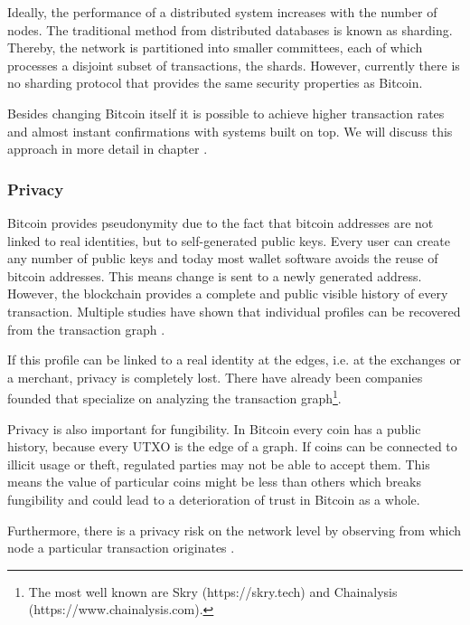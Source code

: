 Ideally, the performance of a distributed system increases with the number of nodes. The traditional method from distributed databases is known as sharding. Thereby, the network is partitioned into smaller committees, each of which processes a disjoint subset of transactions, the shards. However, currently there is no sharding protocol that provides the same security properties as Bitcoin.
 
Besides changing Bitcoin itself it is possible to achieve higher transaction rates and almost instant confirmations with systems built on top. We will discuss this approach in more detail in chapter \parencite{sec:m2m}.
 
\subsubsection{Privacy}
\label{sec:crypto_chall_privacy}

Bitcoin provides pseudonymity due to the fact that bitcoin addresses are not linked to real identities, but to self-generated public keys. Every user can create any number of public keys and today most wallet software avoids the reuse of bitcoin addresses. This means change is sent to a newly generated address. However, the blockchain provides a complete and public visible history of every transaction.  Multiple studies have shown that individual profiles can be recovered from the transaction graph \parencite{Ron2013,Androulaki2013,Reid2013,Babaioff:2012:BRB:2229012.2229022,fi5020237,Spagnuolo2014}.

If this profile can be linked to a real identity at the edges, i.e. at the exchanges or a merchant, privacy is completely lost. There have already been companies founded that specialize on analyzing the transaction graph\footnote{The most well known are Skry (https://skry.tech) and Chainalysis (https://www.chainalysis.com).}.

Privacy is also important for fungibility. In Bitcoin every coin has a public history, because every UTXO is the edge of a graph. If coins can be connected to illicit usage or theft, regulated parties may not be able to accept them. This means the value of particular coins might be less than others which breaks fungibility and could lead to a deterioration of trust in Bitcoin as a whole.

Furthermore, there is a privacy risk on the network level by observing from which node a particular transaction originates \parencite{Koshy2014,Biryukov:2014:DCB:2660267.2660379}.

